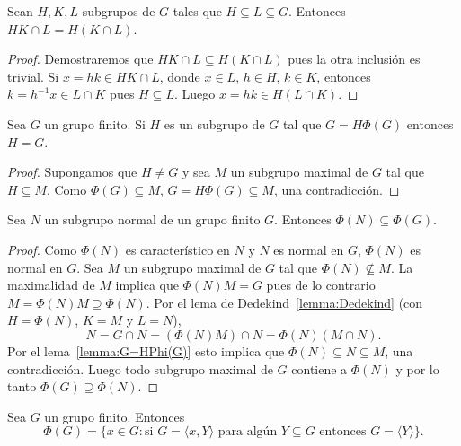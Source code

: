\begin{lemma}[Dedekind]
	\label{lemma:Dedekind}
	Sean $H,K,L$ subgrupos de $G$ tales que $H\subseteq L\subseteq G$. Entonces
	$HK\cap L=H(K\cap L)$.
\end{lemma}

\begin{proof}
	Demostraremos que $HK\cap L\subseteq H(K\cap L)$ pues la otra inclusión es
	trivial. Si $x=hk\in HK\cap L$, donde $x\in L$, $h\in H$, $k\in K$,
	entonces $k=h^{-1}x\in L\cap K$ pues $H\subseteq L$. Luego $x=hk\in H(L\cap
	K)$.
\end{proof}

\begin{lemma}
	\label{lemma:G=HPhi(G)}
	Sea $G$ un grupo finito. Si $H$ es un subgrupo de $G$ tal que $G=H\Phi(G)$
	entonces $H=G$.
\end{lemma}

\begin{proof}
	Supongamos que $H\ne G$ y sea $M$ un subgrupo maximal de $G$ tal que
	$H\subseteq M$. Como $\Phi(G)\subseteq M$, $G=H\Phi(G)\subseteq M$, una
	contradicción.
\end{proof}

\begin{proposition}
	\label{proposition:phi(N)phi(G)}
	Sea $N$ un subgrupo normal de un grupo finito $G$. Entonces
	$\Phi(N)\subseteq\Phi(G)$.
\end{proposition}

\begin{proof}
	Como $\Phi(N)$ es característico en $N$ y $N$ es normal en $G$, $\Phi(N)$
	es normal en $G$.  Sea $M$ un subgrupo maximal de $G$ tal que
	$\Phi(N)\not\subseteq M$.  La maximalidad de $M$ implica que $\Phi(N)M=G$
	pues de lo contrario $M=\Phi(N)M\supseteq\Phi(N)$.  Por el lema de
	Dedekind~\ref{lemma:Dedekind} (con $H=\Phi(N)$, $K=M$ y $L=N$), 
	\[
		N=G\cap N=(\Phi(N)M)\cap N=\Phi(N)(M\cap N).
	\]
	Por el lema~\ref{lemma:G=HPhi(G)} esto implica que $\Phi(N)\subseteq
	N\subseteq M$, una contradicción. Luego todo subgrupo maximal de $G$
	contiene a $\Phi(N)$ y por lo tanto $\Phi(G)\supseteq\Phi(N)$. 
\end{proof}

\begin{lemma}
	\label{lemma:nongenerators}
	Sea $G$ un grupo finito. Entonces 
	\[
	\Phi(G)=\{x\in G:\text{si $G=\langle x,Y\rangle$ para algún $Y\subseteq G$ entonces $G=\langle Y\rangle$}\}.
	\]
\end{lemma}

